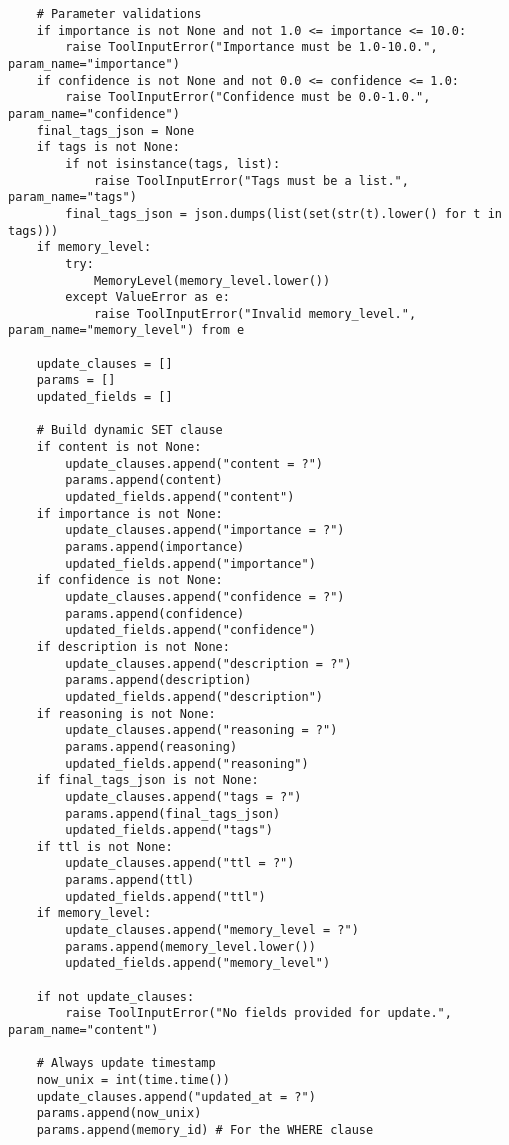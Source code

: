 \documentclass[12pt,a4paper]{article}
\begin{document}
\begin{pageablecode}
\begin{verbatim}
    # Parameter validations
    if importance is not None and not 1.0 <= importance <= 10.0: 
        raise ToolInputError("Importance must be 1.0-10.0.", param_name="importance")
    if confidence is not None and not 0.0 <= confidence <= 1.0: 
        raise ToolInputError("Confidence must be 0.0-1.0.", param_name="confidence")
    final_tags_json = None
    if tags is not None:
        if not isinstance(tags, list): 
            raise ToolInputError("Tags must be a list.", param_name="tags")
        final_tags_json = json.dumps(list(set(str(t).lower() for t in tags)))
    if memory_level:
        try: 
            MemoryLevel(memory_level.lower())
        except ValueError as e: 
            raise ToolInputError("Invalid memory_level.", param_name="memory_level") from e

    update_clauses = []
    params = []
    updated_fields = []

    # Build dynamic SET clause
    if content is not None: 
        update_clauses.append("content = ?")
        params.append(content)
        updated_fields.append("content")
    if importance is not None: 
        update_clauses.append("importance = ?")
        params.append(importance)
        updated_fields.append("importance")
    if confidence is not None: 
        update_clauses.append("confidence = ?")
        params.append(confidence)
        updated_fields.append("confidence")
    if description is not None: 
        update_clauses.append("description = ?")
        params.append(description)
        updated_fields.append("description")
    if reasoning is not None: 
        update_clauses.append("reasoning = ?")
        params.append(reasoning)
        updated_fields.append("reasoning")
    if final_tags_json is not None: 
        update_clauses.append("tags = ?")
        params.append(final_tags_json)
        updated_fields.append("tags")
    if ttl is not None: 
        update_clauses.append("ttl = ?")
        params.append(ttl)
        updated_fields.append("ttl")
    if memory_level: 
        update_clauses.append("memory_level = ?")
        params.append(memory_level.lower())
        updated_fields.append("memory_level")

    if not update_clauses:
        raise ToolInputError("No fields provided for update.", param_name="content")

    # Always update timestamp
    now_unix = int(time.time())
    update_clauses.append("updated_at = ?")
    params.append(now_unix)
    params.append(memory_id) # For the WHERE clause


\end{verbatim}
\end{pageablecode}
\end{document}
